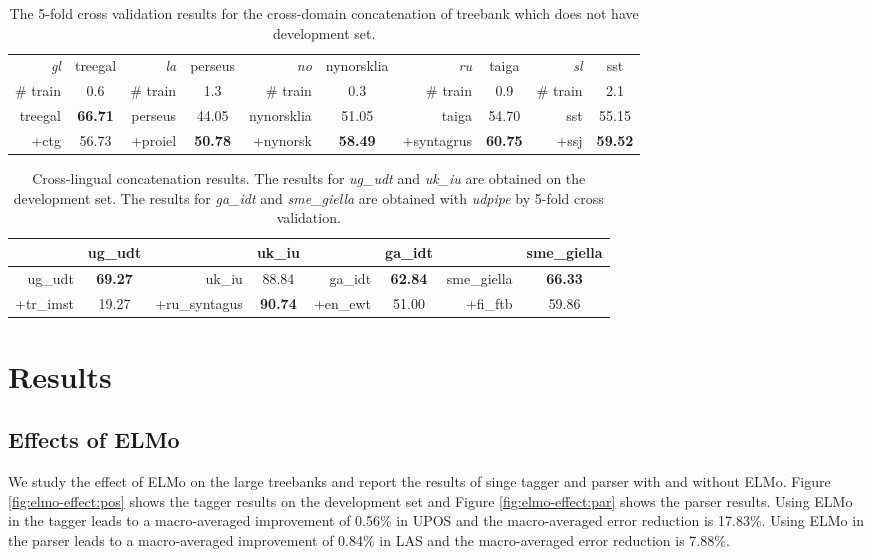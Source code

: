 \documentclass[11pt,a4paper]{article}
\begin{document}
\begin{table}[t]
	\centering
	\small
	\begin{tabular}{rc || rc || rc || rc || rc}
		\textit{gl} & treegal & \textit{la} & perseus & \textit{no} & nynorsklia & \textit{ru} & taiga & \textit{sl} & sst \\
		\# train & 0.6 & \# train & 1.3 & \# train & 0.3 & \# train & 0.9 & \# train & 2.1 \\
		\hline
		treegal & \textbf{66.71} & perseus & 44.05 & nynorsklia & 51.05 & taiga & 54.70 & sst & 55.15 \\
		+ctg & 56.73 & +proiel & \textbf{50.78} & +nynorsk & \textbf{58.49} & +syntagrus & \textbf{60.75} & +ssj & \textbf{59.52} \\
	\end{tabular}
	\caption{The 5-fold cross validation results for the cross-domain concatenation of treebank which does not have development set.}\label{tbl:confuse-mat2}
\end{table}
\begin{table}[t]
	\centering
	\small
	\begin{tabular}{rc || rc || rc || rc}
		& ug\_udt  &  & uk\_iu & & ga\_idt & & sme\_giella \\
		\hline
		ug\_udt & \textbf{69.27} & uk\_iu & 88.84 & ga\_idt & \textbf{62.84} & sme\_giella & \textbf{66.33}\\
		+tr\_imst & 19.27 & +ru\_syntagus & \textbf{90.74} & +en\_ewt &51.00 & +fi\_ftb & 59.86\\
	\end{tabular}
	\caption{Cross-lingual concatenation results. 
		The results for \textit{ug\_udt} and \textit{uk\_iu} are obtained on the development set.
		The results for \textit{ga\_idt} and \textit{sme\_giella} are obtained with \textit{udpipe} by 5-fold cross validation.}\label{tbl:cross-ling-concat}
\end{table}

\section{Results}

\subsection{Effects of ELMo}

We study the effect of ELMo on the large treebanks and report
the results of singe tagger and parser with and without ELMo.
Figure \ref{fig:elmo-effect:pos} shows the tagger results on the development set
and Figure \ref{fig:elmo-effect:par}
shows the parser results.
Using ELMo in the tagger leads to a macro-averaged improvement of 0.56\% in UPOS
and the macro-averaged error reduction is 17.83\%.
Using ELMo in the parser leads to a macro-averaged improvement 
of 0.84\% in LAS and
the macro-averaged error reduction is 7.88\%.
\end{document}
